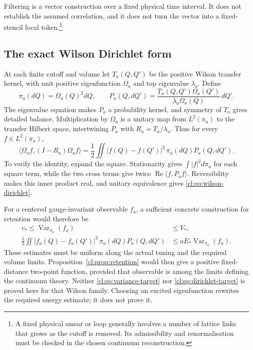 Filtering is a vector construction over a fixed physical time interval.
It does not establish the assumed correlation, and it does not turn
the vector into a fixed-stencil local token.\footnote{A fixed physical
smear or loop generally involves a number of lattice links that grows
as the cutoff is removed. Its admissibility and renormalisation must
be checked in the chosen continuum reconstruction.}

\subsection{The exact Wilson Dirichlet form}
At each finite cutoff and volume let $T_a(Q,Q')$ be the positive
Wilson transfer kernel, with unit positive eigenfunction $\Omega_a$
and top eigenvalue $\lambda_a$. Define
\[
\pi_a(dQ)=\Omega_a(Q)^2dQ,\qquad
P_a(Q,dQ')=\frac{T_a(Q,Q')\Omega_a(Q')}
                         {\lambda_a\Omega_a(Q)}\,dQ'.
\]
The eigenvalue equation makes $P_a$ a probability kernel, and symmetry
of $T_a$ gives detailed balance. Multiplication by $\Omega_a$ is a
unitary map from $L^2(\pi_a)$ to the transfer Hilbert space, intertwining
$P_a$ with $R_a=T_a/\lambda_a$. Thus for every $f\in L^2(\pi_a)$,
\begin{equation}\label{cl:eq:wilson-dirichlet}
\langle\Omega_af,(I-R_a)\Omega_af\rangle
=\frac12\iint|f(Q)-f(Q')|^2\,\pi_a(dQ)P_a(Q,dQ').
\end{equation}
To verify the identity, expand the square. Stationarity gives
$\int|f|^2d\pi_a$ for each square term, while the two cross terms
give twice $\operatorname{Re}\langle f,P_af\rangle$.
Reversibility makes this inner product real, and unitary equivalence
gives \eqref{cl:eq:wilson-dirichlet}.

For a centered gauge-invariant observable $f_a$, a sufficient concrete
construction for retention would therefore be
\begin{align}
v_*\le\operatorname{Var}_{\pi_a}(f_a)&\le V_*,\label{cl:eq:variance-target}\\
\frac12\iint|f_a(Q)-f_a(Q')|^2\,\pi_a(dQ)P_a(Q,dQ')
&\le aE_*\operatorname{Var}_{\pi_a}(f_a).\label{cl:eq:dirichlet-target}
\end{align}
These estimates must be uniform along the actual tuning and the
required volume limits. Proposition~\ref{cl:prop:retention} would
then give a positive fixed-distance two-point function, provided that
observable is among the limits defining the continuum theory.
Neither \eqref{cl:eq:variance-target} nor
\eqref{cl:eq:dirichlet-target} is proved here for that Wilson family.
Choosing an excited eigenfunction rewrites the required energy
estimate; it does not prove it.

